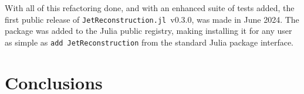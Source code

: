 \documentclass{webofc}
\newcommand{\JR}{\texttt{JetReconstruction.jl}}
\begin{document}
With all of this refactoring done, and with an enhanced suite of tests added,
the first public release of \JR\, v0.3.0, was made in June 2024. The package was
added to the Julia public registry, making installing it for any user as simple
as \texttt{add JetReconstruction} from the standard Julia package interface.

\section{Conclusions}
\label{sec:conclusions}

\sloppy
\raggedright

\end{document}
